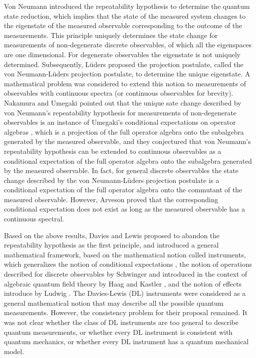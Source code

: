 \documentclass[graybox]{svmult}
\begin{document}
Von Neumann \cite{vN32E} introduced the repeatability hypothesis to determine the quantum
state reduction, which implies that the state of the measured system
changes to the eigenstate of the measured observable corresponding to the outcome
of the measurements.
This principle uniquely determines the state change for measurements of non-degenerate
discrete observables, of which all the eigenspaces are one dimensional. 
For degenerate observables the eigenstate is not uniquely
determined.   Subsequently, L\"{u}ders \cite{Lud51} proposed the
projection postulate, called the von Neumann-L\"{u}ders projection postulate,
to determine the unique eigenstate.
A mathematical problem was considered to extend this notion to measurements of
observables with continuous spectra (or continuous observables for brevity).
Nakamura and Umegaki \cite{NU62} pointed out that the unique sate change described 
by von Neumann's repeatability hypothesis for measurements of non-degenerate observables
 is an instance of Umegaki's conditional expectations on operator algebras \cite{Ume54}, 
 which is a projection of the full operator algebra onto the subalgebra generated by the measured 
 observable, and they conjectured that von Neumann's repeatability hypothesis can be
extended to continuous observables as a conditional expectation of the full operator algebra 
onto the subalgebra generated by the measured observable.
In fact, for general discrete observables the state change described by the 
von Neumann-L\"{u}ders projection postulate is a conditional expectation
of the full operator algebra onto the commutant of the measured observable.
 However, Arveson \cite{Arv67} proved that the corresponding conditional 
 expectation does not exist as long as the measured observable has a continuous
 spectral.
 
 Based on the above results, Davies and Lewis \cite{DL70} proposed to abandon
 the repeatability hypothesis as the first principle, and introduced a general 
 mathematical framework,
 based on the mathematical notion called instruments, which generalizes the notion
 of conditional expectations \cite{Ume54},  the notion of operations
 described for discrete observables by Schwinger \cite{Sch59,Sch60a,Sch60b}
 and introduced in the context of algebraic quantum field theory by 
 Haag and Kastler \cite{HK64}, and the notion of effects introduce by
 Ludwig \cite{Lud67,Lud68}.  
 The Davies-Lewis (DL) instruments were considered as a general mathematical notion
 that may describe all the possible quantum measurements.  However, the
 consistency problem for their proposal remained.
 It was not clear whether the class of DL instruments are too general to describe quantum
 measurements, or whether every DL instrument 
 is consistent with quantum mechanics, or whether every DL instrument
 has a quantum mechanical model.
  
\end{document}
